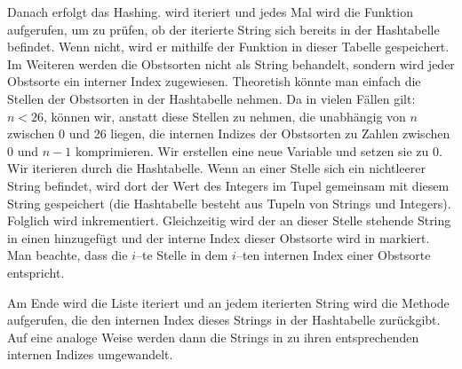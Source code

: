 Danach erfolgt das Hashing.  wird iteriert und jedes Mal wird
die Funktion  aufgerufen, um zu prüfen, ob der iterierte String sich bereits
in der Hashtabelle befindet. Wenn nicht, wird er mithilfe der Funktion  
in dieser Tabelle gespeichert.\\
Im Weiteren werden die Obstsorten nicht als String behandelt, sondern wird jeder Obstsorte
ein interner Index zugewiesen. Theoretish könnte man einfach die Stellen der Obstsorten in der Hashtabelle 
nehmen.
Da in vielen Fällen gilt: $n < 26$, können wir, anstatt diese Stellen zu nehmen, die unabhängig von $n$
zwischen 0 und 26 liegen, die internen Indizes der Obstsorten zu Zahlen zwischen 0 und $n-1$
komprimieren. Wir erstellen eine neue Variable  und setzen sie zu 0. Wir iterieren durch die Hashtabelle. 
Wenn an einer Stelle sich ein nichtleerer String befindet, wird dort der Wert des Integers
im Tupel gemeinsam mit diesem String gespeichert (die Hashtabelle besteht aus Tupeln von Strings und Integers). 
Folglich wird  inkrementiert.
Gleichzeitig wird der an dieser Stelle stehende String in einen   hinzugefügt und
der interne Index dieser Obstsorte wird in  markiert.
Man beachte, dass die $i$--te Stelle in  dem $i$--ten internen Index einer Obstsorte entspricht. 

Am Ende wird die Liste  iteriert und an jedem iterierten String wird
die Methode  aufgerufen, die den internen Index dieses Strings in der Hashtabelle zurückgibt.
Auf eine analoge Weise werden dann die Strings in  zu ihren entsprechenden
internen Indizes umgewandelt.




